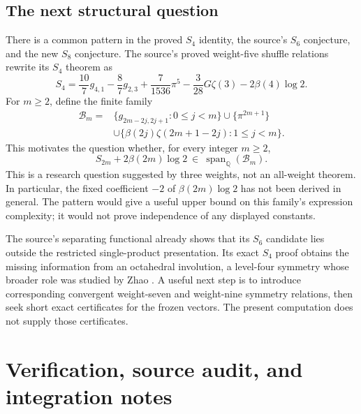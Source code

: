 \documentclass[11pt,letterpaper]{article}
\numberwithin{equation}{section}
\theoremstyle{plain}
\theoremstyle{definition}
\theoremstyle{remark}
\begin{document}
\subsection{The next structural question}
There is a common pattern in the proved $S_4$ identity, the source's
$S_6$ conjecture, and the new $S_8$ conjecture. The source's proved
weight-five shuffle relations rewrite its $S_4$ theorem as
\begin{equation}\label{cont26:eq:s4-even-basket}
 S_4=\frac{10}{7}g_{4,1}-\frac87g_{2,3}
       +\frac7{1536}\pi^5-\frac3{28}G\zeta(3)
       -2\beta(4)\log2.
\end{equation}
For $m\geq2$, define the finite family
\begin{align*}
 \mathcal B_m={}&\{g_{2m-2j,2j+1}:0\leq j<m\}
                 \cup\{\pi^{2m+1}\}\\
 &\cup\{\beta(2j)\zeta(2m+1-2j):1\leq j<m\}.
\end{align*}
This motivates the question whether, for every integer $m\geq2$,
\begin{equation}
 S_{2m}+2\beta(2m)\log2\ \in\
 \operatorname{span}_{\mathbb Q}(\mathcal B_m).
 \label{cont26:eq:even-index-question}
\end{equation}
This is a research question suggested by three weights, not an
all-weight theorem. In particular, the fixed coefficient $-2$ of
$\beta(2m)\log2$ has not been derived in general. The pattern would
give a useful upper bound on this family's expression complexity;
it would not prove independence of any displayed constants.

The source's separating functional already shows that its $S_6$
candidate lies outside the restricted single-product presentation.
Its exact $S_4$ proof obtains the missing information from an
octahedral involution, a level-four symmetry whose broader role was
studied by Zhao \cite{Zhao2008}. A useful next step is to introduce
corresponding convergent weight-seven and weight-nine symmetry
relations, then seek short exact certificates for the frozen vectors.
The present computation does not supply those certificates.



\section{Verification, source audit, and integration notes}
\label{cont26:sec:verification}
\end{document}
